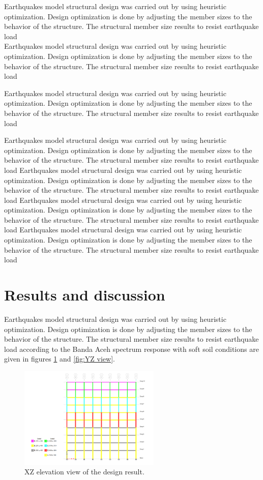 \documentclass{cup-pan}
\begin{document}
Earthquakes model structural design was carried out by using heuristic optimization. Design optimization is done by adjusting the member sizes to the behavior of the structure. The structural member size results to resist earthquake load\\

Earthquakes model structural design was carried out by using heuristic optimization. Design optimization is done by adjusting the member sizes to the behavior of the structure. The structural member size results to resist earthquake load

Earthquakes model structural design was carried out by using heuristic optimization. Design optimization is done by adjusting the member sizes to the behavior of the structure. The structural member size results to resist earthquake load


Earthquakes model structural design was carried out by using heuristic optimization. Design optimization is done by adjusting the member sizes to the behavior of the structure. The structural member size results to resist earthquake load
Earthquakes model structural design was carried out by using heuristic optimization. Design optimization is done by adjusting the member sizes to the behavior of the structure. The structural member size results to resist earthquake load
Earthquakes model structural design was carried out by using heuristic optimization. Design optimization is done by adjusting the member sizes to the behavior of the structure. The structural member size results to resist earthquake load
Earthquakes model structural design was carried out by using heuristic optimization. Design optimization is done by adjusting the member sizes to the behavior of the structure. The structural member size results to resist earthquake load

\section{Results and discussion}
\label{sec:results}

Earthquakes model structural design was carried out by using heuristic optimization. Design optimization is done by adjusting the member sizes to the behavior of the structure. The structural member size results to resist earthquake load according to the Banda Aceh spectrum response with soft soil conditions are given in figures \ref{fig:XZ view} and \ref{fig:YZ view}.

\begin{figure}[H]
\centering
\includegraphics[width=0.6\textwidth]{Picture6.png}
\caption{XZ elevation view of the design result.}
\label{fig:XZ view}
\end{figure}
\end{document}
